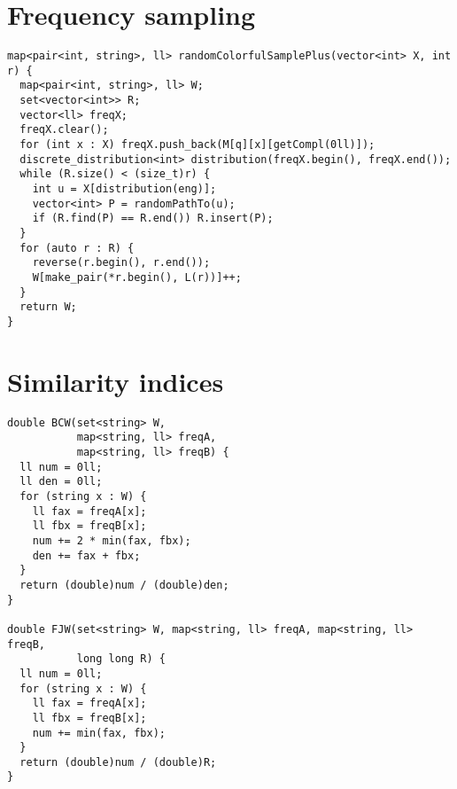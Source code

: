\clearpage
\section*{Frequency sampling}

\begin{lstlisting}
map<pair<int, string>, ll> randomColorfulSamplePlus(vector<int> X, int r) {
  map<pair<int, string>, ll> W;
  set<vector<int>> R;
  vector<ll> freqX;
  freqX.clear();
  for (int x : X) freqX.push_back(M[q][x][getCompl(0ll)]);
  discrete_distribution<int> distribution(freqX.begin(), freqX.end());
  while (R.size() < (size_t)r) {
    int u = X[distribution(eng)];
    vector<int> P = randomPathTo(u);
    if (R.find(P) == R.end()) R.insert(P);
  }
  for (auto r : R) {
    reverse(r.begin(), r.end());
    W[make_pair(*r.begin(), L(r))]++;
  }
  return W;
}
\end{lstlisting}

\clearpage
\section*{Similarity indices}

\begin{lstlisting}
double BCW(set<string> W, 
           map<string, ll> freqA, 
           map<string, ll> freqB) {
  ll num = 0ll;
  ll den = 0ll;
  for (string x : W) {
    ll fax = freqA[x];
    ll fbx = freqB[x];
    num += 2 * min(fax, fbx);
    den += fax + fbx;
  }
  return (double)num / (double)den;
}

double FJW(set<string> W, map<string, ll> freqA, map<string, ll> freqB,
           long long R) {
  ll num = 0ll;
  for (string x : W) {
    ll fax = freqA[x];
    ll fbx = freqB[x];
    num += min(fax, fbx);
  }
  return (double)num / (double)R;
}
\end{lstlisting}


